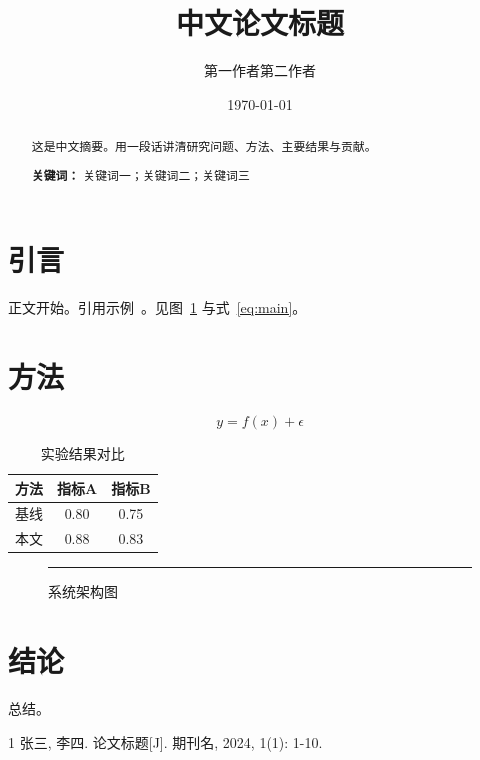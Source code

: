 \documentclass[UTF8,a4paper,12pt]{ctexart}
\title{中文论文标题}
\author{第一作者\quad 第二作者}
\date{\today}
\begin{document}
\maketitle

\begin{abstract}
这是中文摘要。用一段话讲清研究问题、方法、主要结果与贡献。

\noindent\textbf{关键词：} 关键词一；关键词二；关键词三
\end{abstract}

\section{引言}
正文开始。引用示例~\cite{ref1}。见图~\ref{fig:arch} 与式~\eqref{eq:main}。

\section{方法}
\begin{equation}\label{eq:main}
  y = f(x) + \epsilon
\end{equation}

\begin{table}[t]
  \centering
  \caption{实验结果对比}
  \label{tab:res}
  \begin{tabular}{lcc}
    \toprule
    方法 & 指标A & 指标B \\
    \midrule
    基线 & 0.80 & 0.75 \\
    本文 & 0.88 & 0.83 \\
    \bottomrule
  \end{tabular}
\end{table}

\begin{figure}[t]
  \centering
  \rule{0.6\textwidth}{3cm}   %
  \caption{系统架构图}
  \label{fig:arch}
\end{figure}

\section{结论}
总结。

% 
% 
\begin{thebibliography}{1}
 张三, 李四. 论文标题[J]. 期刊名, 2024, 1(1): 1-10.
\end{thebibliography}
\end{document}
